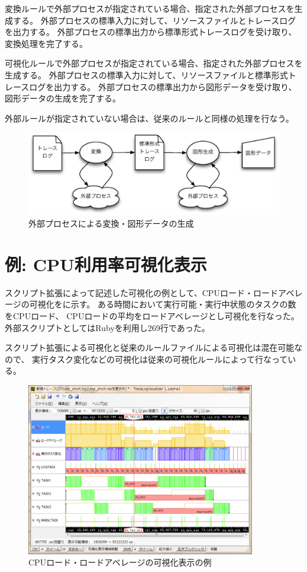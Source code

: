 変換ルールで外部プロセスが指定されている場合、指定された外部プロセスを生成する。
外部プロセスの標準入力に対して、リソースファイルとトレースログを出力する。
外部プロセスの標準出力から標準形式トレースログを受け取り、変換処理を完了する。

可視化ルールで外部プロセスが指定されている場合、指定された外部プロセスを生成する。
外部プロセスの標準入力に対して、リソースファイルと標準形式トレースログを出力する。
外部プロセスの標準出力から図形データを受け取り、図形データの生成を完了する。

外部ルールが指定されていない場合は、従来のルールと同様の処理を行なう。

\begin{figure}
\centering
\includegraphics[width=\textwidth]{se.eps}
\caption{外部プロセスによる変換・図形データの生成}\label{fig:se}
\end{figure}

\section{例: CPU利用率可視化表示}
スクリプト拡張によって記述した可視化の例として、CPUロード・ロードアベレージの可視化をに示す。
ある時間において実行可能・実行中状態のタスクの数をCPUロード、
CPUロードの平均をロードアベレージとし可視化を行なった。
外部スクリプトとしてはRubyを利用し269行であった。

スクリプト拡張による可視化と従来のルールファイルによる可視化は混在可能なので、
実行タスク変化などの可視化は従来の可視化ルールによって行なっている。

\begin{figure}
\centering
\includegraphics[width=10cm]{cpu.png}
\caption{CPUロード・ロードアベレージの可視化表示の例}\label{fig:cpu-use}
\end{figure}


